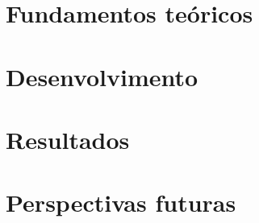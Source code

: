 \documentclass[ twoside,openright,titlepage,numbers=noenddot,headinclude,%
                footinclude=true,cleardoublepage=empty,abstractoff, %
                BCOR=5mm,paper=a4,fontsize=11pt,%
                american,%
                ]{scrreprt}
\begin{document}
 \frenchspacing \raggedbottom {} %
 \pagestyle{plain}
 
 
\cleardoublepage 
\pagestyle{scrheadings} \cleardoublepage
\cleardoublepage{} %
\cleardoublepage
\part{Fundamentos teóricos} 

 
 
\cleardoublepage 

\part{Desenvolvimento}
 


\cleardoublepage
\part{Resultados}
% 
 



\part{Perspectivas futuras}

\appendix
\cleardoublepage
\end{document}
